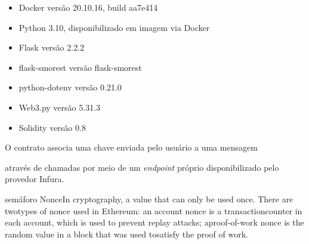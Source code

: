 \begin{itemize}
    \item Docker versão 20.10.16, build aa7e414
    \item Python 3.10, disponibilizado em imagem via Docker
    \item Flask versão 2.2.2
    \item flask-smorest versão flask-smorest
    \item python-dotenv versão 0.21.0
    \item Web3.py versão 5.31.3
    \item Solidity versão 0.8
\end{itemize}

O contrato associa uma chave enviada pelo usuário a uma mensagem

através de chamadas por meio de um \emph{endpoint} próprio disponibilizado pelo provedor Infura.

semáforo
NonceIn cryptography, a value that can only be used once. There are twotypes of nonce used in Ethereum: an account nonce is a transactioncounter in each account, which is used to prevent replay attacks; aproof-of-work nonce is the random value in a block that was used tosatisfy the proof of work.



